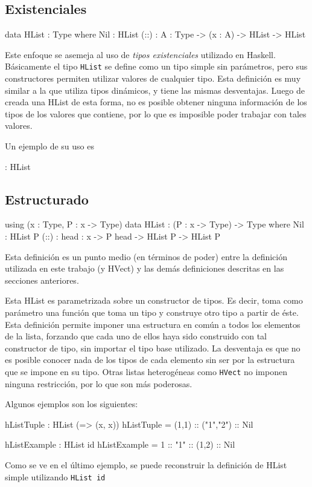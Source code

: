 \subsection{Existenciales}

\begin{code}
data HList : Type where
    Nil : HList
    (::) : {A : Type} -> (x : A) -> HList -> HList
\end{code}

Este enfoque se asemeja al uso de \textit{tipos existenciales} utilizado en Haskell. Básicamente el tipo \texttt{HList} se define como un tipo simple sin parámetros, pero sus constructores permiten utilizar valores de cualquier tipo.
Esta definición es muy similar a la que utiliza tipos dinámicos, y tiene las mismas desventajas. Luego de creada una HList de esta forma, no es posible obtener ninguna información de los tipos de los valores que contiene, por lo que es imposible poder trabajar con tales valores.

Un ejemplo de su uso es

\begin{code}
[1,"2"] : HList
\end{code}

\subsection{Estructurado}

\begin{code}
using (x : Type, P : x -> Type)        
    data HList : (P : x -> Type) ->  Type where
        Nil : HList P
        (::) : {head : x} -> P head -> HList P -> HList P 
\end{code}

Esta definición es un punto medio (en términos de poder) entre la definición utilizada en este trabajo (y HVect) y las demás definiciones descritas en las secciones anteriores.

Esta HList es parametrizada sobre un constructor de tipos. Es decir, toma como parámetro una función que toma un tipo y construye otro tipo a partir de éste. Esta definición permite imponer una estructura en común a todos los elementos de la lista, forzando que cada uno de ellos haya sido construido con tal constructor de tipo, sin importar el tipo base utilizado.
La desventaja es que no es posible conocer nada de los tipos de cada elemento sin ser por la estructura que se impone en su tipo. Otras listas heterogéneas como \texttt{HVect} no imponen ninguna restricción, por lo que son más poderosas.

Algunos ejemplos son los siguientes:

\begin{code}
hListTuple : HList (\x => (x, x))
hListTuple = (1,1) :: ("1","2") :: Nil

hListExample : HList id
hListExample = 1 :: "1" :: (1,2) :: Nil
\end{code}

Como se ve en el último ejemplo, se puede reconstruir la definición de HList simple utilizando \texttt{HList id}
